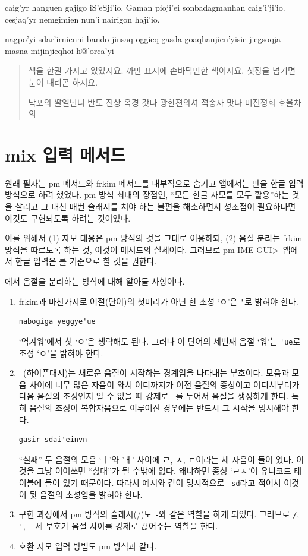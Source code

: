 \documentclass{simplman}
\newcommand*\pmime{\<3\textsf{pm IME GUI}>}
\let\opt\stopt
\begin{document}
\begin{exampleonly}
caig'yr hanguen gajigo iS'eSji'io. Gaman pioji'ei sonbadagmanhan caig'i'ji'io.
cesjaq'yr nemgimien nun'i nairigon haji'io.

nagpo'yi sdar'irnienni bando jinsaq oggieq gasda goaqhanjien'yisie jiegsoqja masna mijinjieqhoi h@'orca'yi
\end{exampleonly}
\begin{quote}\exemfont
책을 한권 가지고 있었지요. 까만 표지에 손바닥만한 책이지요.
첫장을 넘기면 눈이 내리곤 하지요.

낙포의 ᄯᅡᆯ일년니 반도 진상 옥경 갓다 광한젼의셔 젹송자 맛나 미진졍회 ᄒᆞ올차의
\end{quote}

\section{mix 입력 메서드}

원래 필자는 pm 메서드와 frkim 메서드를 내부적으로 숨기고 앱에서는 \opt{mix}만을 한글 입력 
방식으로 하려 했었다. pm 방식 최대의 장점인, ``모든 한글 자모를 모두 활용''하는 것을 살리고
그 대신 매번 슬래시를 쳐야 하는 불편을 해소하면서 성조점이 필요하다면 이것도 구현되도록 하려는 것이었다.

이를 위해서 (1) 자모 대응은 pm 방식의 것을 그대로 이용하되, (2) 음절 분리는 frkim 방식을
따르도록 하는 것, 이것이 \opt{mix} 메서드의 실체이다.
그러므로 \pmime\ 앱에서 한글 입력은 \opt{mix}를 기준으로 할 것을 권한다.

\opt{mix}에서 음절을 분리하는 방식에 대해 알아둘 사항이다.
\begin{enumerate}[\quad(1)]\oblivoirlist
\item frkim과 마찬가지로 어절(단어)의 첫머리가 아닌 한 초성 `ㅇ'은 \verb|'|로 밝혀야 한다.
\begin{verbatim}
nabogiga yeggye'ue
\end{verbatim}
`역겨워'에서 첫 `ㅇ'은 생략해도 된다. 그러나 이 단어의 세번째 음절 `워'는 \verb|'ue|로
초성 `ㅇ'을 밝혀야 한다.
\item \verb|-|(하이픈대시)는 새로운 음절이 시작하는 경계임을 나타내는 부호이다. 모음과 모음 사이에 너무 많은 자음이 와서 어디까지가 이전 음절의 종성이고 어디서부터가 다음 음절의 초성인지 알 수 없을 때 강제로 \verb|-|를 두어서 음절을 생성하게 한다. 특히 음절의 초성이 복합자음으로 이루어진 경우에는 반드시 그 시작을 명시해야 한다.
\begin{verbatim}
gasir-sdai'einvn
\end{verbatim}
``실ᄯᅢ'' 두 음절의 모음 `ㅣ'와 'ㅐ' 사이에 ㄹ, ㅅ, ㄷ이라는 세 자음이 들어 있다.
이것을 그냥 이어쓰면 ``싨대''가 될 수밖에 없다. 왜냐하면 종성 `ㄹㅅ'이 유니코드
테이블에 들어 있기 때문이다. 따라서 예시와 같이
명시적으로 \verb|-sd|라고 적어서 이것이 뒷 음절의 초성임을 밝혀야 한다.
\item 구현 과정에서 pm 방식의 슬래시(/)도 \verb|-|와 같은 역할을 하게 되었다. 그러므로 \verb|/|, \verb|'|, \verb|-| 세 부호가 음절 사이를 강제로 끊어주는 역할을 한다.
\item 호환 자모 입력 방법도 pm 방식과 같다.
\end{enumerate}
\end{document}
